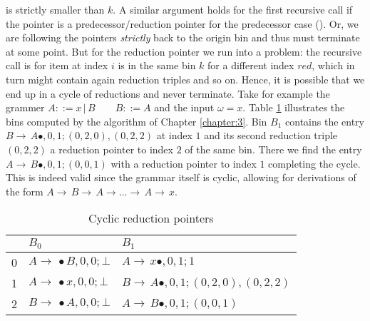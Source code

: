 \begin{isabellebody}
\begin{isamarkuptext}
is strictly smaller than $k$. A similar argument holds for the first recursive call if the pointer
is a predecessor/reduction pointer for the predecessor case (). Or, we are following
the pointers \textit{strictly} back to the origin bin and thus must terminate at some point. But for
the reduction pointer we run into a problem: the recursive call is for item at index $i$ is in the same
bin $k$ for a different index $red$, which in turn might contain again reduction triples and so on.
Hence, it is possible that we end up in a cycle of reductions and never terminate. Take for example the
grammer $A ::= x \, | \, B \qquad B ::= A$ and the input $\omega = x$. Table \ref{tab:cyclic-pointers}
illustrates the bins computed by the algorithm of Chapter \ref{chapter:3}. Bin $B_1$ contains the entry
$B \rightarrow \, A \bullet, 0, 1; (0, 2, 0),(0, 2, 2)$ at index $1$ and its second reduction triple
$(0, 2, 2)$ a reduction pointer to index $2$ of the same bin. There we find the entry
$A \rightarrow \, B \bullet, 0, 1; (0, 0, 1)$ with a reduction pointer to index $1$ completing the
cycle. This is indeed valid since the grammar itself is cyclic, allowing for derivations of the form
$A \rightarrow \, B \rightarrow \, A \rightarrow \dots \rightarrow \, A \rightarrow \, x$.

  \begin{table}[htpb]
    \caption[Cyclic reduction pointers]{Cyclic reduction pointers} \label{tab:cyclic-pointers}
    \centering
    \begin{tabular}{| l | l | l |}
          & $B_0$                                     & $B_1$ \\
      \midrule
        0 & $A \rightarrow \, \bullet B, 0, 0; \bot$  & $A \rightarrow \, x \bullet, 0, 1; 1$ \\
        1 & $A \rightarrow \, \bullet x, 0, 0; \bot$  & $B \rightarrow \, A \bullet, 0, 1; (0, 2, 0),(0, 2, 2)$ \\
        2 & $B \rightarrow \, \bullet A, 0, 0; \bot$  & $A \rightarrow \, B \bullet, 0, 1; (0, 0, 1)$ \\
    \end{tabular}
  \end{table}


\end{isamarkuptext}
\end{isabellebody}
